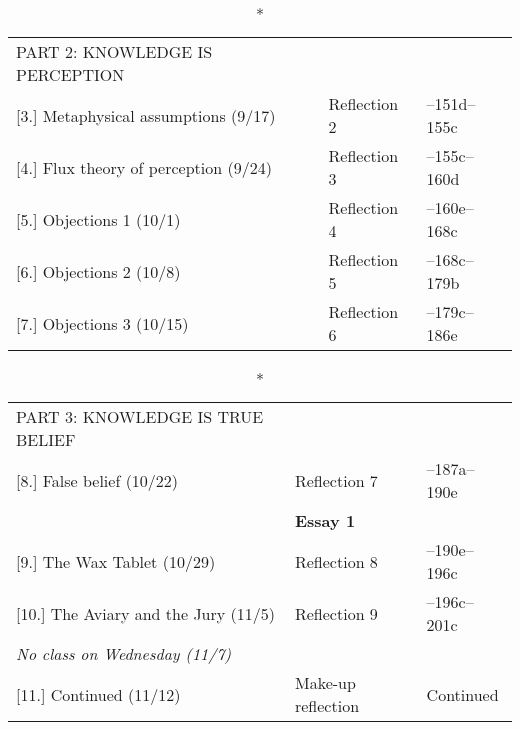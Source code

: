 \documentclass[article,oneside]{memoir}
\begin{document}
								
\begin{center}
\begin{longtable}{p{6cm}p{3cm}p{5cm}}
  \caption*{PART 2: KNOWLEDGE IS PERCEPTION} \\

		
[3.] Metaphysical assumptions  (9/17)		& Reflection 2		&  --151d--155c \\ 


[4.] Flux theory of perception  (9/24)		& Reflection 3		& --155c--160d \\ 


[5.] Objections 1  (10/1)				& Reflection 4		& --160e--168c \\ 


[6.] Objections 2 (10/8)				& Reflection 5		 & --168c--179b \\


[7.] Objections 3 (10/15)	   			& Reflection 6		 & --179c--186e    \\

\end{longtable}
\end{center}
\vspace{-1.5cm}
\begin{center}
\begin{longtable}{p{6cm}p{3cm}p{5cm}}
 
  \caption*{PART 3: KNOWLEDGE IS TRUE BELIEF	} \\
  					
  
[8.] False belief (10/22)			 	& Reflection 7		& --187a--190e  \\
								& \textbf{Essay 1}	&  \\



[9.] The Wax Tablet	(10/29)			& Reflection 8		& --190e--196c\\

[10.] The Aviary and the Jury	(11/5)	& Reflection 9		& --196c--201c \\ 

\emph{No class on Wednesday (11/7)}		    			& 				& \\

[11.] Continued (11/12)				& Make-up reflection		& Continued \\ 

\end{longtable}
\end{center}
\end{document}

